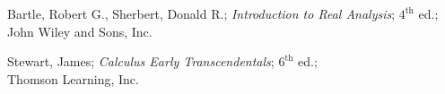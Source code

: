 \begin{thebibliography}{9}
Bartle, Robert G., Sherbert, Donald R.; \textit{Introduction to Real Analysis}; $4^{\text{th}}$ ed.;\\ John Wiley and Sons, Inc.

Stewart, James; \textit{Calculus Early Transcendentals}; $6^{\text{th}}$ ed.;\\ Thomson Learning, Inc.

\end{thebibliography}